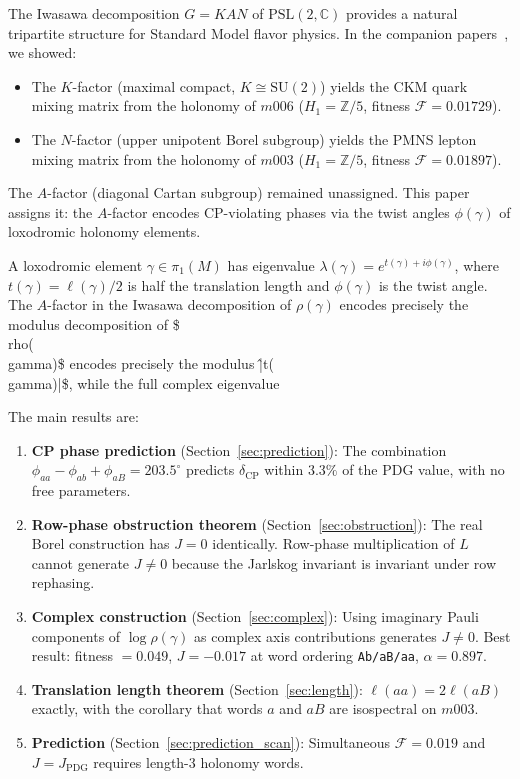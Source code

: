 \documentclass[epjc3]{svjour3}
\newcommand{\PSL}{\mathrm{PSL}(2,\mathbb{C})}
\newcommand{\SUtwo}{\mathrm{SU}(2)}
\begin{document}
The Iwasawa decomposition $G = KAN$ of $\PSL$ provides a natural
tripartite structure for Standard Model flavor physics.
In the companion papers~\cite{Gentry:CKM,Gentry:PMNS}, we showed:
\begin{itemize}
\item The $K$-factor (maximal compact, $K \cong \SUtwo$) yields the
CKM quark mixing matrix from the holonomy of $m006$
($H_1 = \mathbb{Z}/5$, fitness $\mathcal{F} = 0.01729$).
\item The $N$-factor (upper unipotent Borel subgroup) yields the
PMNS lepton mixing matrix from the holonomy of $m003$
($H_1 = \mathbb{Z}/5$, fitness $\mathcal{F} = 0.01897$).
\end{itemize}
The $A$-factor (diagonal Cartan subgroup) remained unassigned.
This paper assigns it: the $A$-factor encodes CP-violating phases
via the twist angles $\phi(\gamma)$ of loxodromic holonomy elements.

A loxodromic element $\gamma \in \pi_1(M)$ has eigenvalue
$\lambda(\gamma) = e^{t(\gamma) + i\phi(\gamma)}$, where
$t(\gamma) = \ell(\gamma)/2$ is half the translation length and
$\phi(\gamma)$ is the twist angle. The $A$-factor in the Iwasawa
decomposition of $\rho(\gamma)$ encodes precisely the modulus
decomposition of \$\\rho(\\gamma)\$ encodes precisely the modulus
\^{|t(\\gamma)|}\$, while the full complex eigenvalue

The main results are:
\begin{enumerate}
\item \textbf{CP phase prediction} (Section~\ref{sec:prediction}):
The combination $\phi_{aa} - \phi_{ab} + \phi_{aB} = 203.5^\circ$
predicts $\delta_{\mathrm{CP}}$ within $3.3\%$ of the PDG value,
with no free parameters.

\item \textbf{Row-phase obstruction theorem}
(Section~\ref{sec:obstruction}):
The real Borel construction has $J = 0$ identically.
Row-phase multiplication of $L$ cannot generate $J \neq 0$
because the Jarlskog invariant is invariant under row rephasing.

\item \textbf{Complex construction}
(Section~\ref{sec:complex}):
Using imaginary Pauli components of $\log\rho(\gamma)$ as
complex axis contributions generates $J \neq 0$.
Best result: fitness $= 0.049$, $J = -0.017$ at word ordering
\texttt{Ab/aB/aa}, $\alpha = 0.897$.

\item \textbf{Translation length theorem}
(Section~\ref{sec:length}):
$\ell(aa) = 2\ell(aB)$ exactly, with the corollary that
words $a$ and $aB$ are isospectral on $m003$.

\item \textbf{Prediction}
(Section~\ref{sec:prediction_scan}):
Simultaneous $\mathcal{F} = 0.019$ and $J = J_{\mathrm{PDG}}$
requires length-3 holonomy words.
\end{enumerate}
\end{document}
